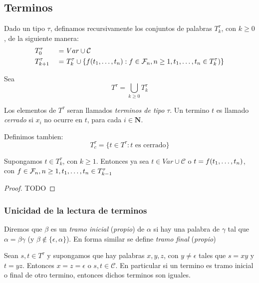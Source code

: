 \subsection{Terminos}

Dado un tipo $\tau$, definamos recursivamente los conjuntos de palabras $T_k^\tau$, con $k \geq 0$, de la siguiente manera:
\begin{alignat*}{3}
  &T_0^\tau &\ =&\ Var \cup \mathcal{C}\\
  &T_{k+1}^\tau &\ =&\ T_{k}^\tau \cup \{f(t_{1}, \dots, t_{n}) : f \in \mathcal{F}_n, n \geq 1, t_{1}, \dots, t_{n} \in T_k^\tau)\} 
\end{alignat*}

Sea
$$
T^\tau = \bigcup_{k \geq 0}T_k^\tau
$$

Los elementos de $T^\tau$ seran llamados \emph{terminos de tipo} $\tau$. Un termino $t$ es llamado \emph{cerrado} si $x_i$ no ocurre en $t$, para cada $i \in \mathbf{N}$.

Definimos tambien:
$$
T_c^\tau = \{t \in T^\tau : t \text{ es cerrado}\}
$$

\begin{lemma}
  Supongamos $t \in T_k^\tau$, con $k \geq 1$. Entonces ya sea $t \in Var \cup \mathcal{C}$ o $t = f(t_{1}, \dots, t_{n})$, con
  $f \in \mathcal{F}_n, n \geq 1, t_{1}, \dots, t_{n} \in T_{k-1}^\tau$
\end{lemma}

\begin{proof}
  TODO
\end{proof}

\subsubsection{Unicidad de la lectura de terminos}

\begin{definition}
  Diremos que $\beta$ es un \emph{tramo inicial} (\emph{propio}) de $\alpha$ si hay una palabra de $\gamma$ tal que $\alpha = \beta\gamma$ (y $\beta \notin \{\epsilon, \alpha\}$).
  En forma similar se define \emph{tramo final} (\emph{propio})
\end{definition}

\begin{lemma}
  Sean $s, t \in T^\tau$ y supongamos que hay palabras $x, y, z$, con $y \neq \epsilon$ tales que $s = xy$ y $t = yz$. Entonces 
  $x = z = \epsilon$ o $s, t \in \mathcal{C}$. En particular si un termino es tramo inicial o final de otro termino, entonces dichos terminos son iguales.
\end{lemma}
\noproof

